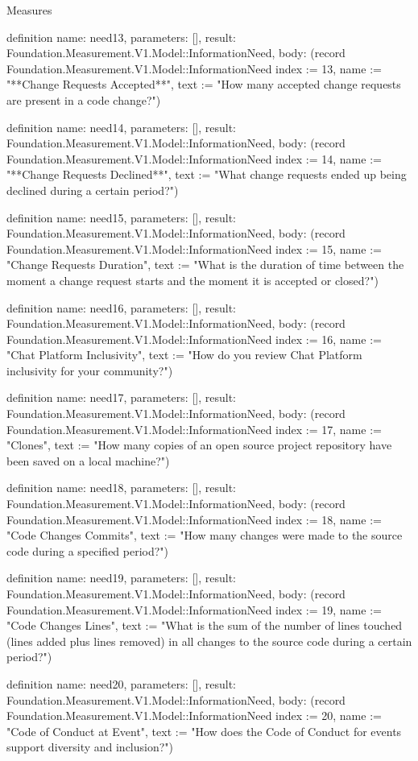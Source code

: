 \begin{lexlean}{Measures}
\begin{semanticmodule}
definition{
  name: need13,
  parameters: [],
  result: Foundation.Measurement.V1.Model::InformationNeed,
  body: (record Foundation.Measurement.V1.Model::InformationNeed {index := 13, name := "**Change Requests Accepted**", text := "How many accepted change requests are present in a code change?"})
}

definition{
  name: need14,
  parameters: [],
  result: Foundation.Measurement.V1.Model::InformationNeed,
  body: (record Foundation.Measurement.V1.Model::InformationNeed {index := 14, name := "**Change Requests Declined**", text := "What change requests ended up being declined during a certain period?"})
}

definition{
  name: need15,
  parameters: [],
  result: Foundation.Measurement.V1.Model::InformationNeed,
  body: (record Foundation.Measurement.V1.Model::InformationNeed {index := 15, name := "Change Requests Duration", text := "What is the duration of time between the moment a change request starts and the moment it is accepted or closed?"})
}

definition{
  name: need16,
  parameters: [],
  result: Foundation.Measurement.V1.Model::InformationNeed,
  body: (record Foundation.Measurement.V1.Model::InformationNeed {index := 16, name := "Chat Platform Inclusivity", text := "How do you review Chat Platform inclusivity for your community?"})
}

definition{
  name: need17,
  parameters: [],
  result: Foundation.Measurement.V1.Model::InformationNeed,
  body: (record Foundation.Measurement.V1.Model::InformationNeed {index := 17, name := "Clones", text := "How many copies of an open source project repository have been saved on a local machine?"})
}

definition{
  name: need18,
  parameters: [],
  result: Foundation.Measurement.V1.Model::InformationNeed,
  body: (record Foundation.Measurement.V1.Model::InformationNeed {index := 18, name := "Code Changes Commits", text := "How many changes were made to the source code during a specified period?"})
}

definition{
  name: need19,
  parameters: [],
  result: Foundation.Measurement.V1.Model::InformationNeed,
  body: (record Foundation.Measurement.V1.Model::InformationNeed {index := 19, name := "Code Changes Lines", text := "What is the sum of the number of lines touched (lines added plus lines removed) in all changes to the source code during a certain period?"})
}

definition{
  name: need20,
  parameters: [],
  result: Foundation.Measurement.V1.Model::InformationNeed,
  body: (record Foundation.Measurement.V1.Model::InformationNeed {index := 20, name := "Code of Conduct at Event", text := "How does the Code of Conduct for events support diversity and inclusion?"})
}


\end{semanticmodule}
\end{lexlean}
